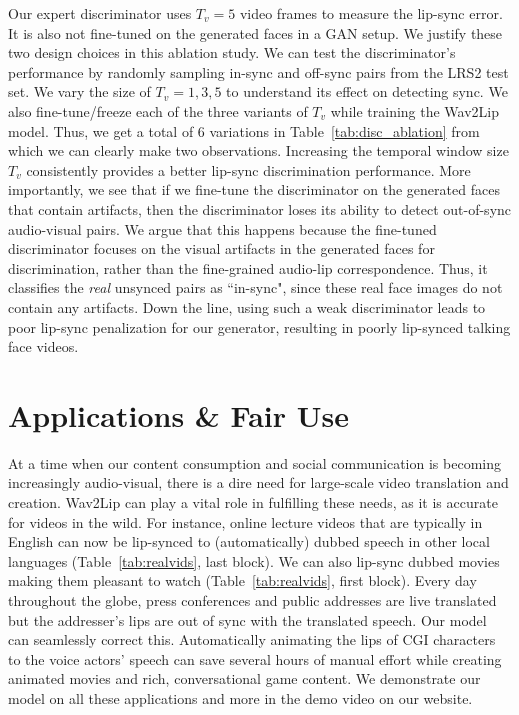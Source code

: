 \documentclass[sigconf]{acmart}
\begin{document}
Our expert discriminator uses $T_v=5$ video frames to measure the lip-sync error. It is also not fine-tuned on the generated faces in a GAN setup. We justify these two design choices in this ablation study. We can test the discriminator's performance by randomly sampling in-sync and off-sync pairs from the LRS2 test set. We vary the size of $T_v=1, 3, 5$ to understand its effect on detecting sync. We also fine-tune/freeze each of the three variants of $T_v$ while training the Wav2Lip model. Thus, we get a total of $6$ variations in Table~\ref{tab:disc_ablation} from which we can clearly make two observations. Increasing the temporal window size $T_v$ consistently provides a better lip-sync discrimination performance. More importantly, we see that if we fine-tune the discriminator on the generated faces that contain artifacts, then the discriminator loses its ability to detect out-of-sync audio-visual pairs. We argue that this happens because the fine-tuned discriminator focuses on the visual artifacts in the generated faces for discrimination, rather than the fine-grained audio-lip correspondence. Thus, it classifies the \textit{real} unsynced pairs as ``in-sync", since these real face images do not contain any artifacts. Down the line, using such a weak discriminator leads to poor lip-sync penalization for our generator, resulting in poorly lip-synced talking face videos.

\section{Applications \& Fair Use}
\label{sec:apps}
At a time when our content consumption and social communication is becoming increasingly audio-visual, there is a dire need for large-scale video translation and creation. Wav2Lip can play a vital role in fulfilling these needs, as it is accurate for videos in the wild. For instance, online lecture videos that are typically in English can now be lip-synced to (automatically) dubbed speech in other local languages (Table~\ref{tab:realvids}, last block). We can also lip-sync dubbed movies making them pleasant to watch (Table~\ref{tab:realvids}, first block). Every day throughout the globe, press conferences and public addresses are live translated but the addresser's lips are out of sync with the translated speech. Our model can seamlessly correct this. Automatically animating the lips of CGI characters to the voice actors' speech can save several hours of manual effort while creating animated movies and rich, conversational game content. We demonstrate our model on all these applications and more in the demo video on our website. 
\end{document}
